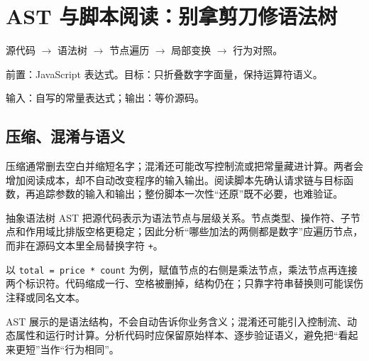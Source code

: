 \chapter{AST 与脚本阅读：别拿剪刀修语法树}\label{ch:ast}
\begin{tcolorbox}[title=章首知识地图,colframe=Ink]
源代码 $\longrightarrow$ 语法树 $\longrightarrow$ 节点遍历 $\longrightarrow$ 局部变换 $\longrightarrow$ 行为对照。
\end{tcolorbox}

\begin{tcolorbox}[title=学习目标与前置知识,colframe=Ink!65,colback=Ink!2]
前置：JavaScript 表达式。目标：只折叠数字字面量，保持运算符语义。\par
输入：自写的常量表达式；输出：等价源码。
\end{tcolorbox}

\section{压缩、混淆与语义}
压缩通常删去空白并缩短名字；混淆还可能改写控制流或把常量藏进计算。两者会增加阅读成本，却不自动改变程序的输入输出。阅读脚本先确认请求链与目标函数，再追踪参数的输入和输出；整份脚本一次性“还原”既不必要，也难验证。

\begin{definition}{抽象语法树}
AST 把源代码表示为语法节点与层级关系。节点类型、操作符、子节点和作用域比排版空格更稳定；因此分析“哪些加法的两侧都是数字”应遍历节点，而非在源码文本里全局替换字符 \texttt{+}。
\end{definition}

以 \texttt{total = price * count} 为例，赋值节点的右侧是乘法节点，乘法节点再连接两个标识符。代码缩成一行、空格被删掉，结构仍在；只靠字符串替换则可能误伤注释或同名文本。

\begin{center}
\end{center}

\begin{warning}
AST 展示的是语法结构，不会自动告诉你业务含义；混淆还可能引入控制流、动态属性和运行时计算。分析代码时应保留原始样本、逐步验证语义，避免把“看起来更短”当作“行为相同”。
\end{warning}

